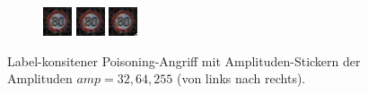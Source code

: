 \documentclass[11pt,a4paper]{article}
\numberwithin{equation}{section}
\begin{document}
\begin{figure}
	\centering
	
	\begin{subfigure}{.3\textwidth}
		\centering
		\includegraphics[width=.3\linewidth]{32_1corner_infty300}
		\includegraphics[width=.3\linewidth]{64_1_coner:infty300}
		\includegraphics[width=.3\linewidth]{255_1corner_infty300}
			
	\end{subfigure}
	
	\caption{Label-konsitener Poisoning-Angriff mit Amplituden-Stickern der Amplituden $amp=32,64,255$ (von links nach rechts).}		
	\label{im:CLPA_amplitudes}
\end{figure}
	
\end{document}
